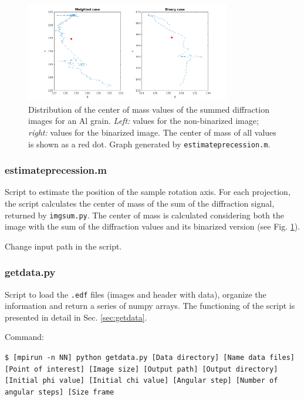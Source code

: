 \documentclass[11pt]{scrartcl}
\begin{document}
\begin{figure}[h]
    \centering
    \includegraphics[width=0.8\textwidth]{Estimate_CM.png}
    \caption{Distribution of the center of mass values of the summed diffraction images for an Al grain. {\emph{Left:}} values for the non-binarized image; {\emph{right:}} values for the binarized image. The center of mass of all values is shown as a red dot. Graph generated by {\texttt{estimate\textunderscore precession.m}}.}
    \label{fig:estimate_CM}
\end{figure}

\subsubsection{estimate\textunderscore precession.m}

Script to estimate the position of the sample rotation axis. For each projection, the script calculates the center of mass of the sum of the diffraction signal, returned by {\texttt{img\textunderscore sum.py}}. The center of mass is calculated considering both the image with the sum of the diffraction values and its binarized version (see Fig. \ref{fig:estimate_CM}).

\danger Change input path in the script.

\subsubsection{getdata.py}
\label{script:getdata}

Script to load the {\texttt{.edf}} files (images and header with data), organize the information and return a series of numpy arrays. The functioning of the script is presented in detail in Sec. \ref{sec:getdata}.

Command:

{\texttt{\$ [mpirun -n NN] python getdata.py [Data directory] [Name data files] [Point of interest] [Image size] [Output path] [Output directory] [Initial phi value] [Initial chi value] [Angular step] [Number of angular steps] [Size frame}}
\end{document}
